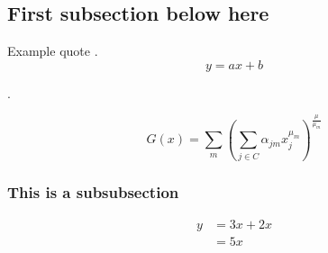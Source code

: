 
\subsection{First subsection below here}

Example quote \cite{bierlaire_theoretical_2006}.
\blindtext
\begin{equation}
y = ax + b
\end{equation}

\blindtext.

\begin{equation}
  G(x) = \sum_{m} \left( \sum_{j \in C} \alpha_{jm} x_j^{\mu_m} \right)^{\frac{\mu}{\mu_m}}
\end{equation}


\subsubsection{This is a subsubsection}

\begin{align}
  y &= 3x + 2x \\
  & = 5x
\end{align}

\blindtext
